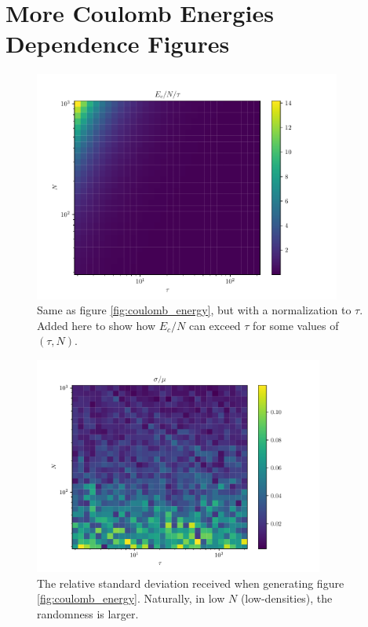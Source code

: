 \chapter{More Coulomb Energies Dependence Figures}\label{chap:coulomb}

\begin{figure}[h]
	\begin{center}
		\includegraphics[width=0.9\textwidth]{graphics/coulomb_energy_example@relative_coulomb_energy.pdf}
	\end{center}
	\caption{Same as figure \ref{fig:coulomb_energy}, but with a normalization to $\tau$. Added here to show how $E_c/N$ can exceed $\tau$ for some values of $(\tau,N)$.}
	\label{fig:coulomb_energy_normalized}
\end{figure}

\begin{figure}
	\begin{center}
		\includegraphics[width=0.85\textwidth]{graphics/coulomb_energy_example@relative_std.pdf}
	\end{center}
	\caption{The relative standard deviation received when generating figure \ref{fig:coulomb_energy}. Naturally, in low $N$ (low-densities), the randomness is larger.}
	\label{fig:coulomb_energy_std}
\end{figure}

